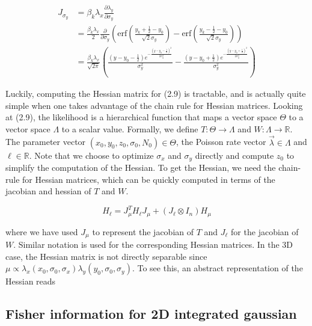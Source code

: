 \begin{align*}
J_{\sigma_{y}} &= \beta_{k}\lambda_{x}\frac{\partial \lambda_{y}}{\partial \sigma_{y}} \\
&= \frac{\beta_{k}\lambda_{x}}{2}\frac{\partial}{\partial \sigma_{y}}\left(\mathrm{erf}\left(\frac{y_{k}+\frac{1}{2}-y_{0}}{\sqrt{2}\sigma_{y}}\right) -\mathrm{erf}\left(\frac{y_{k}-\frac{1}{2}-y_{0}}{\sqrt{2}\sigma_{y}}\right)\right)\\
&= \frac{\beta_{k}\lambda_{x}}{\sqrt{2\pi}}\left(\frac{\left(y-y_{0}-\frac{1}{2}\right) e^{-\frac{\left(y-y_{0}-\frac{1}{2}\right)^2}{2 \sigma_{y} ^2}}}{\sigma_{y} ^2}-\frac{ \left(y-y_{0}+\frac{1}{2}\right) e^{-\frac{\left(y-y_{0}+\frac{1}{2}\right)^2}{2 \sigma_{y} ^2}}}{\sigma_{y} ^2}\right)
\end{align*}

Luckily, computing the Hessian matrix for (2.9) is tractable, and is actually quite simple when one takes advantage of the chain rule for Hessian matrices. Looking at (2.9), the likelihood is a hierarchical function that maps a vector space $\Theta$ to a vector space $\Lambda$ to a scalar value. Formally, we define $T: \Theta \rightarrow \Lambda$ and $W: \Lambda \rightarrow \mathbb{R}$. The parameter vector $(x_{0},y_{0},z_{0}, \sigma_{0}, N_{0})\in \Theta$, the Poisson rate vector $\vec{\lambda} \in \Lambda$ and $\ell \in \mathbb{R}$. Note that we choose to optimize $\sigma_{x}$ and $\sigma_{y}$ directly and compute $z_{0}$ to simplify the computation of the Hessian. To get the Hessian, we need the chain-rule for Hessian matrices, which can be quickly computed in terms of the jacobian and hessian of $T$ and $W$.


\begin{equation*}
H_{\ell} = J_{\mu}^{T} H_{\ell} J_{\mu} + (J_{\ell}\otimes I_{n})H_{\mu}
\end{equation*}

where we have used $J_{\mu}$ to represent the jacobian of $T$ and $J_{\ell}$ for the jacobian of $W$. Similar notation is used for the corresponding Hessian matrices. 
In the 3D case, the Hessian matrix is not directly separable since $\mu \propto \lambda_{x}(x_{0},\sigma_{0},\sigma_{x})\lambda_{y}(y_{0},\sigma_{0},\sigma_{y})$. To see this, an abstract representation of the Hessian reads 


\subsection{Fisher information for 2D integrated gaussian}

